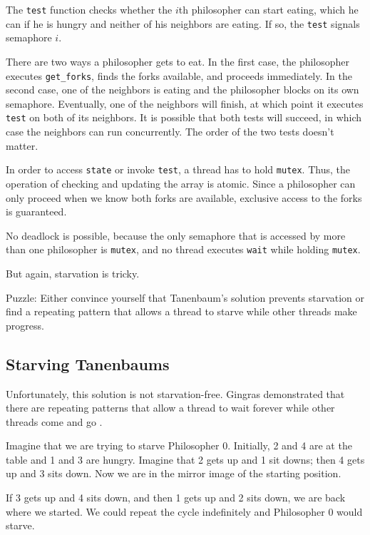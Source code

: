 \documentclass{book}
\newcommand{\clearemptydoublepage}{\newpage\cleardoublepage}
\begin{document}

The {\tt test} function checks whether the $i$th philosopher can
start eating, which he can if he is hungry and
neither of his neighbors are eating.  If so, the {\tt test} signals
semaphore $i$.

There are two ways a philosopher gets to eat.  In the first case, the
philosopher executes {\tt get\_forks}, finds the forks available, and
proceeds immediately.  In the second case, one of the neighbors is
eating and the philosopher blocks on its own semaphore.  Eventually,
one of the neighbors will finish, at which point it executes {\tt
test} on both of its neighbors.  It is possible that both tests
will succeed, in which case the neighbors can run concurrently.
The order of the two tests doesn't matter.

In order to access {\tt state} or invoke {\tt test}, a thread
has to hold {\tt mutex}.  Thus, the operation of checking and
updating the array is atomic.  Since a philosopher can only proceed
when we know both forks are available, exclusive access to the forks
is guaranteed.

No deadlock is possible, because the only semaphore that is accessed
by more than one philosopher is {\tt mutex}, and no thread executes
{\tt wait} while holding {\tt mutex}.

But again, starvation is tricky.

Puzzle: Either convince yourself that Tanenbaum's solution prevents
starvation or find a repeating pattern that allows a thread to starve
while other threads make progress.


\clearemptydoublepage
\subsection{Starving Tanenbaums}

Unfortunately, this solution is not starvation-free.  Gingras
demonstrated that there are repeating patterns that allow a
thread to wait forever while other threads come and go
\cite{gingras90dining}.

Imagine that we are trying to starve Philosopher 0.  Initially,
2 and 4 are at the table and 1 and 3 are hungry.  Imagine that 2 gets up and
1 sit downs; then 4 gets up and 3 sits down.
Now we are in the mirror image of the starting position.

If 3 gets up and 4 sits
down, and then 1 gets up and 2 sits down, we are back
where we started.  We could repeat the cycle indefinitely and
Philosopher 0 would starve.
\end{document}
